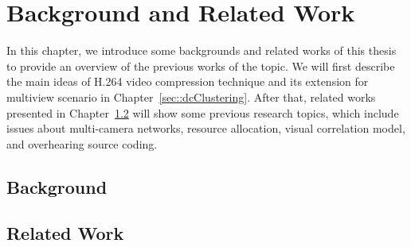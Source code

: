 \section{Background and Related Work}
\label{sec::backgroundAndRelatedWork}
In this chapter, we introduce some backgrounds and related works of this thesis to provide an overview of the previous works of the topic.
We will first describe the main ideas of H.264 video compression technique and its extension for multiview scenario in Chapter~\ref{sec::dcClustering}.
After that, related works presented in Chapter~\ref{sec::relatedWork} will show some previous research topics, which include issues about multi-camera networks, resource allocation, visual correlation model, and overhearing source coding.
%
\subsection{Background}
\label{sec::background}


%
\subsection{Related Work}
\label{sec::relatedWork}
